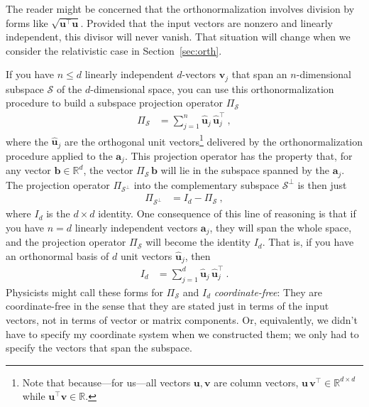 \documentclass{article}
\newcommand{\proj}{\mathsf{\Pi}}
\newcommand{\Evec}[1]{{\mathbf{#1}}} %
\newcommand{\Ehat}[1]{{\mathbf{\hat{#1}}}} %
\newcommand{\secref}[1]{Section~\ref{#1}}
\begin{document}
The reader might be concerned that the orthonormalization involves division by forms like $\sqrt{\Evec{u}^\top\Evec{u}}$.
Provided that the input vectors are nonzero and linearly independent, this divisor will never vanish.
That situation will change when we consider the relativistic case in \secref{sec:orth}.

If you have $n\leq d$ linearly independent $d$-vectors $\Evec{v}_j$ that span an $n$-dimensional subspace $\mathscr{S}$ of the $d$-dimensional space, you can use this orthonormalization procedure to build a subspace projection operator $\proj_\mathscr{S}$
\begin{align}\label{eq:oproj}
    \proj_\mathscr{S} &= \sum_{j=1}^n \Ehat{u}_j\,\Ehat{u}_j^\top ~,
\end{align}
where the $\Ehat{u}_j$ are the orthogonal unit vectors\footnote{Note that because---for us---all vectors $\Evec{u},\Evec{v}$ are column vectors, $\Evec{u}\,\Evec{v}^\top\in\mathbb{R}^{d\times d}$ while $\Evec{u}^\top \Evec{v}\in\mathbb{R}$.} delivered by the orthonormalization procedure applied to the $\Evec{a}_j$.
This projection operator has the property that, for any vector $\Evec{b}\in\mathbb{R}^d$, the vector $\proj_\mathscr{S}\,\Evec{b}$ will lie in the subspace spanned by the $\Evec{a}_j$.
The projection operator $\proj_{\mathscr{S}^\perp}$ into the complementary subspace $\mathscr{S}^\perp$ is then just
\begin{align}\label{eq:oprojcomp}
    \proj_{\mathscr{S}^\perp} &= I_d - \proj_\mathscr{S} ~,
\end{align}
where $I_d$ is the $d\times d$ identity.
One consequence of this line of reasoning is that if you have $n=d$ linearly independent vectors $\Evec{a}_j$, they will span the whole space, and the projection operator $\proj_\mathscr{S}$ will become the identity $I_d$.
That is, if you have an orthonormal basis of $d$ unit vectors $\Ehat{u}_j$, then
\begin{align}\label{eq:oI}
    I_d &= \sum_{j=1}^d \Ehat{u}_j\,\Ehat{u}_j^\top ~.
\end{align}
Physicists might call these forms for $\proj_\mathscr{S}$ and $I_d$ \emph{coordinate-free}:
They are coordinate-free in the sense that they are stated just in terms of the input vectors, not in terms of vector or matrix components.
Or, equivalently, we didn't have to specify my coordinate system when we constructed them; we only had to specify the vectors that span the subspace.
\end{document}
